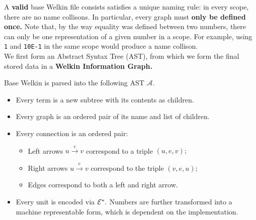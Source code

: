 A \textbf{valid} base Welkin file consists satisfies a unique naming rule: in every scope, there are no name collisons. In particular, every graph must \textbf{only be defined once.} Note that, by the way equality was defined between two numbers,
  there can only be one representation of a given number in a scope. For example, using \texttt{1} and \texttt{10E-1} in the same scope would produce a name collison.
\\ We first form an Abstract Syntax Tree (AST), from which we form the final stored data in a \textbf{Welkin Information Graph.}
\begin{definition}
  Base Welkin is parsed into the following AST $\mathcal{A}.$
  \begin{itemize}
	\item Every term is a new subtree with its contents as children.
    \item Every graph is an ordered pair of its name and list of children.
    \item Every connection is an ordered pair:
		  \begin{itemize}
			\item Left arrows $u \xrightarrow{e} v$ correspond to a triple $(u, e, v);$
			\item Right arrows $u \xrightarrow{e} v$ correspond to the triple $(v, e, u);$
			\item Edges correspond to both a left and right arrow.
		  \end{itemize}
	\item Every unit is encoded via $\mathcal{E}^{*}.$ Numbers are further transformed into a machine representable form, which is dependent on the implementation.
  \end{itemize}
 \end{definition}
